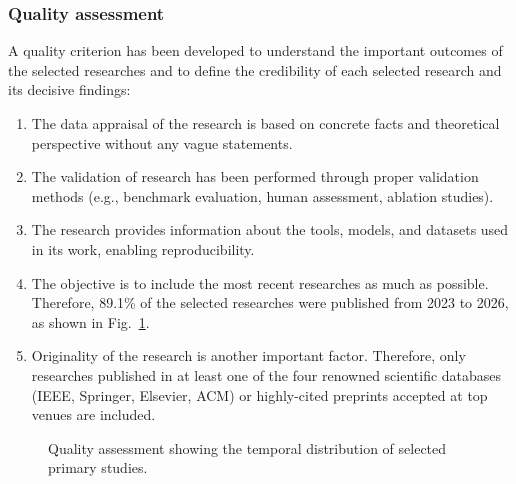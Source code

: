 \documentclass[10pt,a4paper]{article}
\begin{document}
\subsubsection{Quality assessment}
\label{sec:quality_assessment}
A quality criterion has been developed to understand the important outcomes of the selected researches and to define the credibility of each selected research and its decisive findings:
\begin{enumerate}[leftmargin=*]
\item The data appraisal of the research is based on concrete facts and theoretical perspective without any vague statements.
\item The validation of research has been performed through proper validation methods (e.g., benchmark evaluation, human assessment, ablation studies).
\item The research provides information about the tools, models, and datasets used in its work, enabling reproducibility.
\item The objective is to include the most recent researches as much as possible. Therefore, 89.1\% of the selected researches were published from 2023 to 2026, as shown in Fig.~\ref{fig:year_distribution}.
\item Originality of the research is another important factor. Therefore, only researches published in at least one of the four renowned scientific databases (IEEE, Springer, Elsevier, ACM) or highly-cited preprints accepted at top venues are included.
\end{enumerate}

\begin{figure}[!t]
\centering
{}
\caption{Quality assessment showing the temporal distribution of selected primary studies.}
\label{fig:year_distribution}
\end{figure}
\end{document}
